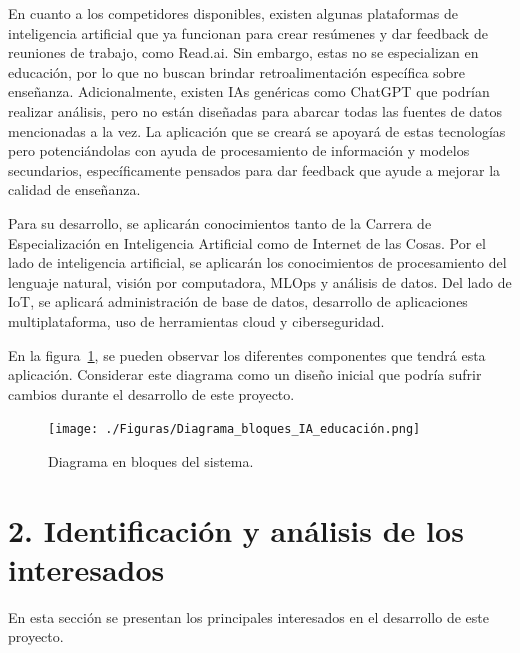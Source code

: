 \documentclass[
11pt, %
codirector, %
]{charter}
\begin{document}
En cuanto a los competidores disponibles, existen algunas plataformas de inteligencia artificial que ya funcionan para crear resúmenes y dar feedback de reuniones de trabajo, como Read.ai. Sin embargo, estas no se especializan en educación, por lo que no buscan brindar retroalimentación específica sobre enseñanza. Adicionalmente, existen IAs genéricas como ChatGPT que podrían realizar análisis, pero no están diseñadas para abarcar todas las fuentes de datos mencionadas a la vez. La aplicación que se creará se apoyará de estas tecnologías pero potenciándolas con ayuda de procesamiento de información y modelos secundarios, específicamente pensados para dar feedback que ayude a mejorar la calidad de enseñanza.

Para su desarrollo, se aplicarán conocimientos tanto de la Carrera de Especialización en Inteligencia Artificial como de Internet de las Cosas. Por el lado de inteligencia artificial, se aplicarán los conocimientos de procesamiento del lenguaje natural, visión por computadora, MLOps y análisis de datos. Del lado de IoT, se aplicará administración de base de datos, desarrollo de aplicaciones multiplataforma, uso de herramientas cloud y ciberseguridad.

En la figura~\ref{fig:diagBloques}, se pueden observar los diferentes componentes que tendrá esta aplicación. Considerar este diagrama como un diseño inicial que podría sufrir cambios durante el desarrollo de este proyecto.

\begin{figure}[htbp]
\centering 
\texttt{[image: ./Figuras/Diagrama\_bloques\_IA\_educación.png]}
\caption{Diagrama en bloques del sistema.}
\label{fig:diagBloques}
\end{figure}

\vspace{25px}



\section{2. Identificación y análisis de los interesados}
\label{sec:interesados}

En esta sección se presentan los principales interesados en el desarrollo de este proyecto.
\end{document}
